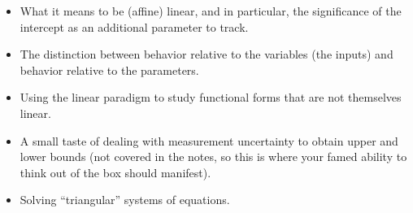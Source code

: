 \documentclass[10pt]{amsart}
\begin{document}
\begin{itemize}
\item What it means to be (affine) linear, and in particular, the
  significance of the intercept as an additional parameter to track.
\item The distinction between behavior relative to the variables (the
  inputs) and behavior relative to the parameters.
\item Using the linear paradigm to study functional forms that are not
  themselves linear.
\item A small taste of dealing with measurement uncertainty to obtain
  upper and lower bounds (not covered in the notes, so this is where
  your famed ability to think out of the box should manifest).
\item Solving ``triangular'' systems of equations.
\end{itemize}
\end{document}
